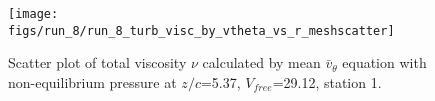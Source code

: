 \begin{figure}[H]
\centering
\texttt{[image: figs/run\_8/run\_8\_turb\_visc\_by\_vtheta\_vs\_r\_meshscatter]}
\caption{Scatter plot of total viscosity $\nu$ calculated by mean $\bar{v}_{\theta}$ equation with non-equilibrium pressure at $z/c$=5.37, $V_{free}$=29.12, station 1.}
\label{fig:run_8_turb_visc_by_vtheta_vs_r_meshscatter}
\end{figure}


